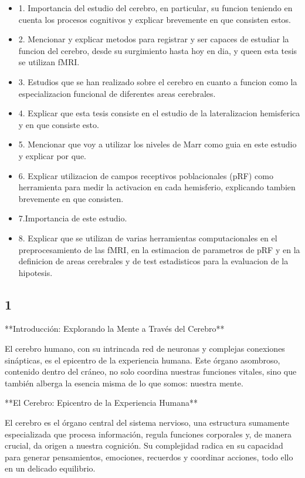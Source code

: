 \documentclass[12pt,oneside]{uhthesis}
\begin{document}
\begin{itemize}
	\item 1. Importancia del estudio del cerebro, en particular, su funcion teniendo en cuenta los procesos cognitivos y explicar brevemente en que consisten estos.
	\item 2. Mencionar y explicar metodos para registrar y ser capaces de estudiar la funcion del cerebro, desde su surgimiento hasta hoy en dia, y queen esta tesis se utilizan fMRI.
	\item 3. Estudios que se han realizado sobre el cerebro en cuanto a funcion como la especializacion funcional de diferentes areas cerebrales.
	\item 4. Explicar que esta tesis consiste en el estudio de la lateralizacion hemisferica y en que consiste esto.
	\item 5. Mencionar que voy a utilizar los niveles de Marr como guia en este estudio y explicar por que. 
	\item 6. Explicar utilizacion de campos receptivos poblacionales (pRF) como herramienta para medir la activacion en cada hemisferio, explicando tambien brevemente en que consisten. 
	\item 7.Importancia de este estudio.
	\item 8. Explicar que se utilizan de varias herramientas computacionales  en el preprocesamiento de las fMRI, en la estimacion de parametros de pRF y en la definicion de areas cerebrales y de test estadisticos para la evaluacion de la hipotesis.
\end{itemize}

\subsection{1}
**Introducción: Explorando la Mente a Través del Cerebro**

El cerebro humano, con su intrincada red de neuronas y complejas conexiones sinápticas, es el epicentro de la experiencia humana. Este órgano asombroso, contenido dentro del cráneo, no solo coordina nuestras funciones vitales, sino que también alberga la esencia misma de lo que somos: nuestra mente.

**El Cerebro: Epicentro de la Experiencia Humana**

El cerebro es el órgano central del sistema nervioso, una estructura sumamente especializada que procesa información, regula funciones corporales y, de manera crucial, da origen a nuestra cognición. Su complejidad radica en su capacidad para generar pensamientos, emociones, recuerdos y coordinar acciones, todo ello en un delicado equilibrio.
\end{document}
